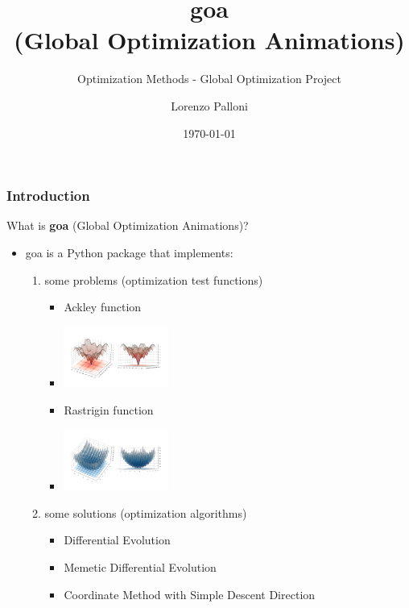 \documentclass{beamer}
\title[OM - 2021/22 - Lorenzo Palloni]{goa\\ (Global Optimization Animations)}
\subtitle{Optimization Methods - Global Optimization Project}
\author{Lorenzo Palloni}
\institute[]{
  University of Florence\\
  \medskip
  \textit{lorenzo.palloni@stud.unifi.it}
}
\date{\today}
\begin{document}
\begin{frame}
\titlepage %
\end{frame}

\begin{frame}
\frametitle{Introduction}
  What is \textbf{goa} (Global Optimization Animations)?
  \begin{itemize}
    \item goa is a Python package that implements:
    \begin{enumerate}
      \item some problems (optimization test functions)
      \begin{itemize}
        \item Ackley function
        \item[] \includegraphics[width=0.3\textwidth]{figures/introduction-ackley}
        \item Rastrigin function
        \item[] \includegraphics[width=0.3\textwidth]{figures/introduction-rastrigin}
      \end{itemize}
      \item some solutions (optimization algorithms)
      \begin{itemize}
        \item Differential Evolution \cite{de-original}
        \item Memetic Differential Evolution \cite{mde-2021}
        \item Coordinate Method with Simple Descent Direction \cite{textbook}
      \end{itemize}
    \end{enumerate}
  \end{itemize}
\end{frame}
\end{document}
